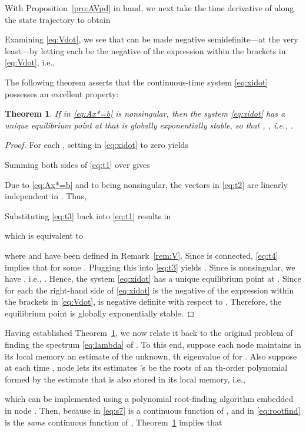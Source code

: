 \documentclass[11pt]{article}
\theoremstyle{plain}
\newtheorem{theorem}{Theorem}
\theoremstyle{definition}
\theoremstyle{remark}
\begin{document}
With Proposition~\ref{pro:AVpd} in hand, we next take the time derivative of  along the state trajectory  to obtain

Examining \eqref{eq:Vdot}, we see that  can be made negative semidefinite---at the very least---by letting each  be the negative of the expression within the brackets in \eqref{eq:Vdot}, i.e.,

The following theorem asserts that the continuous-time system \eqref{eq:xidot} possesses an excellent property:

\begin{theorem}\label{thm:uniqeqptges}
If  in \eqref{eq:Ax*=b} is nonsingular, then the system \eqref{eq:xidot} has a unique equilibrium point at  that is globally exponentially stable, so that , , i.e.,  .
\end{theorem}

\begin{proof}
For each , setting  in \eqref{eq:xidot} to zero yields

Summing both sides of \eqref{eq:t1} over  gives

Due to \eqref{eq:Ax*=b} and to  being nonsingular, the vectors  in \eqref{eq:t2} are linearly independent in . Thus,

Substituting \eqref{eq:t3} back into \eqref{eq:t1} results in

which is equivalent to

where  and  have been defined in Remark~\ref{rem:V}. Since  is connected, \eqref{eq:t4} implies that   for some . Plugging this into \eqref{eq:t3} yields  . Since  is nonsingular, we have , i.e., . Hence, the system \eqref{eq:xidot} has a unique equilibrium point at . Since for each  the right-hand side of \eqref{eq:xidot} is the negative of the expression within the brackets in \eqref{eq:Vdot},  is negative definite with respect to . Therefore, the equilibrium point  is globally exponentially stable.
\end{proof}

Having established Theorem~\ref{thm:uniqeqptges}, we now relate it back to the original problem of finding the spectrum \eqref{eq:lambda} of . To this end, suppose each node  maintains in its local memory an estimate  of the unknown, th eigenvalue  of  for . Also suppose at each time , node  lets its  estimates 's be the roots of an th-order polynomial formed by the estimate  that is also stored in its local memory, i.e.,

which can be implemented using a polynomial root-finding algorithm embedded in node . Then, because  in \eqref{eq:s7} is a continuous function of , and  in \eqref{eq:rootfind} is the {\em same} continuous function of , Theorem~\ref{thm:uniqeqptges} implies that
\end{document}
